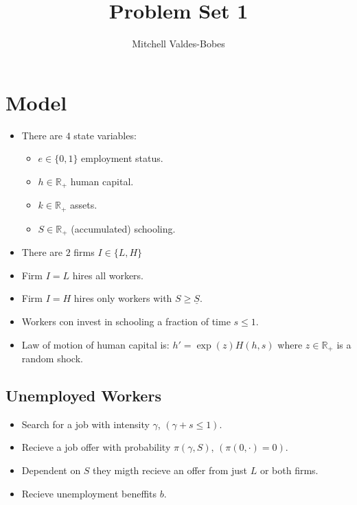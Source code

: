 \documentclass[12pt]{article}
\begin{document}
\title{Problem Set 1 }
\author{Mitchell Valdes-Bobes}
\maketitle



\section{Model}

\begin{itemize}
    \item There are $4$ state variables:
    \begin{itemize}
        \item $e \in \{0,1\}$ employment status.
        \item $h \in \mathbb{R}_+$ human capital.
        \item $k \in \mathbb{R}_+$ assets.
        \item $S \in \mathbb{R}_+$ (accumulated) schooling.
    \end{itemize}
    \item There are $2$ firms $I \in \{L,H\}$
    \item Firm $I=L$ hires all workers.
    \item Firm $I=H$ hires only workers with $S \geq \underline{S}$.
    \item Workers con invest in schooling a fraction of time $s\leq 1$.
    \item Law of motion of human capital is: $h' = \exp(z) H(h,s)$ where $z \in \mathbb{R}_+$ is a random shock. 
\end{itemize}

\subsection{Unemployed Workers}
\begin{itemize}
    \item Search for a job with intensity $\gamma$, $(\gamma + s \leq 1)$.
    \item Recieve a job offer with probability $\pi(\gamma, S)$, $(\pi(0,\cdot) = 0)$.    
    \item Dependent on $S$ they migth recieve an offer from just $L$ or both firms.
    \item Recieve unemployment beneffits $b$.
\end{itemize}
\end{document}
